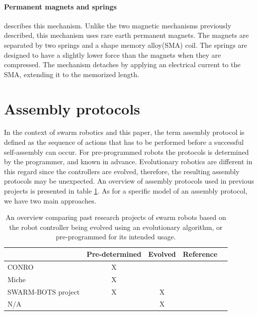 \paragraph*{Permanent magnets and springs }
\cite{murata_hardware_2000} describes this mechanism.
Unlike the two magnetic mechanisms previously described, this mechanism uses rare earth permanent magnets.
The magnets are separated by two springs and a shape memory alloy(SMA) coil.
The springs are designed to have a slightly lower force than the magnets when they are compressed.
The mechanism detaches by applying an electrical current to the SMA, extending it to the memorized length.


\section{Assembly protocols}
\label{sec:protocol}
In the context of swarm robotics and this paper, the term assembly protocol is defined as the sequence of actions that has to be performed before a successful self-assembly can occur. 
For pre-programmed robots the protocols is determined by the programmer, and known in advance.
Evolutionary robotics are different in this regard since the controllers are evolved, therefore, the resulting assembly protocols may be unexpected. 
An overview of assembly protocols used in previous projects is presented in table \ref{tab:protocols}.
As for a specific model of an assembly protocol, we have two main approaches. 

\begin{table}[H]
	\centering
	\begin{tabular}{ | l | c | c | c | p{5cm} |}
		\hline
		& Pre-determined & Evolved & Reference\\ \hline
		CONRO & X & & \cite{castano_conro:_2000}\\ \hline
		Miche & X & & \cite{gilpin_miche:_2008}\\ \hline
		SWARM-BOTS project & X & X & \cite{gross_object_2006, trianni_evolving_2004}\\ \hline
		N/A & & X & \cite{weel_emergence_2012}\\ \hline
	\end{tabular}
	\caption{An overview comparing past research projects of swarm robots based on the robot controller being evolved using an evolutionary algorithm, or pre-programmed for its intended usage.}
	
	\label{tab:protocols}
\end{table}

